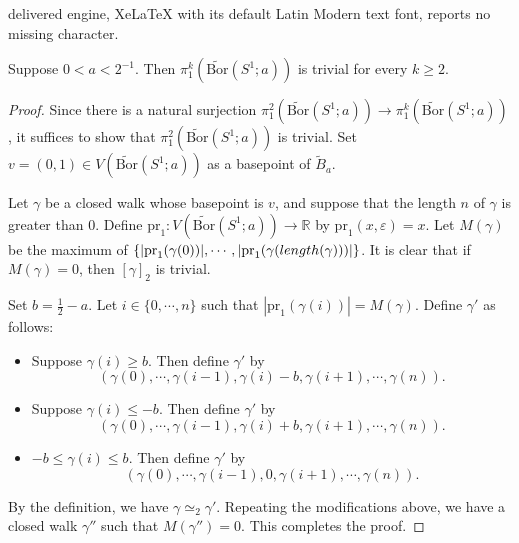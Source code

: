 \documentclass[10pt,a4paper]{amsart}
\newcommand{\RR}{\mathbb{R}}
\newcommand{\pr}{\mathrm{pr}}
\newcommand{\tBor}{\widetilde{\mathrm{Bor}}}
\newcommand{\tB}{\widetilde{B}}
\begin{document}
delivered engine, XeLaTeX with its default Latin Modern text font, reports no missing character.
\begin{lemma} \label{lemma simply-connected}
Suppose $0 < a < 2^{-1}$. Then $\pi_1^k(\tBor(S^1; a))$ is trivial for every $k \ge 2$.
\end{lemma}

\begin{proof}
Since there is a natural surjection $\pi_1^2(\tBor(S^1; a)) \to \pi_1^k(\tBor(S^1;a))$, it suffices to show that $\pi_1^2(\tBor(S^1; a))$ is trivial. Set $v = (0,1) \in V(\tBor(S^1; a))$ as a basepoint of $\tB_a$.

Let $\gamma$ be a closed walk whose basepoint is $v$, and suppose that the length $n$ of $\gamma$ is greater than $0$. Define $\pr_1 \colon V(\tBor(S^1; a)) \to \RR$ by $\pr_1(x, \varepsilon) = x$. Let $M(\gamma)$ be the maximum of $\{ |\pr_1(\gamma(0))|, \cdots, |\pr_1(\gamma({\rm length}(\gamma)))|\}$. It is clear that if $M(\gamma) = 0$, then $[\gamma]_2$ is trivial.

Set $b = \frac{1}{2} - a$. Let $i \in \{ 0, \cdots, n\}$ such that $|\pr_1(\gamma(i))| = M(\gamma)$. Define $\gamma'$ as follows:
\begin{itemize}
\item Suppose $\gamma(i) \ge b$. Then define $\gamma'$ by
\[ \left( \gamma(0), \cdots, \gamma(i-1), \gamma(i) - b, \gamma(i+1), \cdots, \gamma(n) \right).\]

\item Suppose $\gamma(i) \le -b$. Then define $\gamma'$ by
\[ \left( \gamma(0), \cdots, \gamma(i-1), \gamma(i) + b, \gamma(i+1), \cdots, \gamma(n)\right).\]

\item $-b \le \gamma(i) \le b$. Then define $\gamma'$ by
\[ \left(\gamma(0), \cdots, \gamma(i-1), 0, \gamma(i+1), \cdots, \gamma(n)\right).\]
\end{itemize}
By the definition, we have $\gamma \simeq_2 \gamma'$. Repeating the modifications above, we have a closed walk $\gamma''$ such that $M(\gamma'') = 0$. This completes the proof.
\end{proof}
\end{document}

